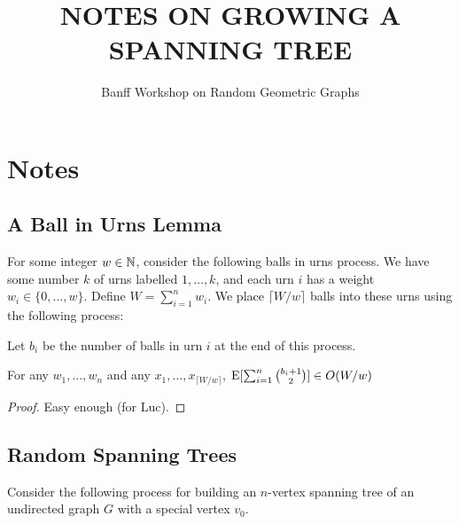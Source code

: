 \documentclass[lotsofwhite]{patmorin}
\title{\MakeUppercase{Notes on Growing a Spanning Tree}}
\author{Banff Workshop on Random Geometric Graphs}
\begin{document}
\maketitle

\section{Notes}


\subsection{A Ball in Urns Lemma}

For some integer $w\in\mathbb{N}$, consider the following balls in urns process.
We have some number $k$ of urns labelled $1,\ldots,k$, and each urn
$i$ has a weight $w_i\in\{0,\ldots,w\}$.  Define $W=\sum_{i=1}^n w_i$.
We place $\lceil W/w\rceil$ balls into these urns using the following
process:

\noindent
\begin{algorithmic}
   \ENDFOR
\end{algorithmic}

Let $b_i$ be the number of balls in urn $i$ at the end of this process.

\begin{lem}
   For any $w_1,\ldots,w_n$ and any $x_1,\ldots,x_{\lceil W/w\rceil}$,
   $\mathrm{E}[\sum_{i=1}^n \binom{b_i+1}{2}] \in O(W/w)$
\end{lem}

\begin{proof}
Easy enough (for Luc).
\end{proof}

\subsection{Random Spanning Trees}

Consider the following process for building an $n$-vertex spanning tree
of an undirected graph $G$ with a special vertex $v_0$.

\noindent
\begin{algorithmic}
  \ENDFOR
\end{algorithmic}
\end{document}
